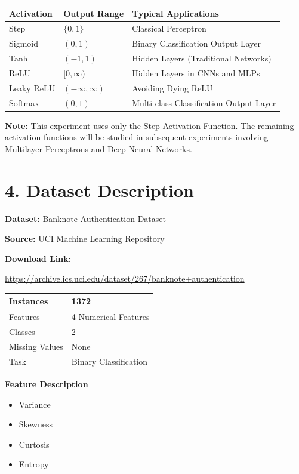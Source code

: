 \documentclass{article}
\begin{document}
\begin{center}
\begin{tabular}{|p{2.5cm}|p{3cm}|p{6cm}|}
\hline
\textbf{Activation} & \textbf{Output Range} & \textbf{Typical Applications}\\
\hline
Step & $\{0,1\}$ & Classical Perceptron\\
\hline
Sigmoid & $(0,1)$ & Binary Classification Output Layer\\
\hline
Tanh & $(-1,1)$ & Hidden Layers (Traditional Networks)\\
\hline
ReLU & $[0,\infty)$ & Hidden Layers in CNNs and MLPs\\
\hline
Leaky ReLU & $(-\infty,\infty)$ & Avoiding Dying ReLU\\
\hline
Softmax & $(0,1)$ & Multi-class Classification Output Layer\\
\hline
\end{tabular}
\end{center}

\textbf{Note:} This experiment uses only the Step Activation Function. The remaining activation functions will be studied in subsequent experiments involving Multilayer Perceptrons and Deep Neural Networks.

\section*{4. Dataset Description}

\textbf{Dataset:} Banknote Authentication Dataset

\textbf{Source:} UCI Machine Learning Repository

\textbf{Download Link:}

\url{https://archive.ics.uci.edu/dataset/267/banknote+authentication}

\begin{center}
\begin{tabular}{|l|l|}
\hline
Instances & 1372\\
\hline
Features & 4 Numerical Features\\
\hline
Classes & 2\\
\hline
Missing Values & None\\
\hline
Task & Binary Classification\\
\hline
\end{tabular}
\end{center}

\textbf{Feature Description}

\begin{itemize}
\item Variance
\item Skewness
\item Curtosis
\item Entropy
\end{itemize}
\end{document}
